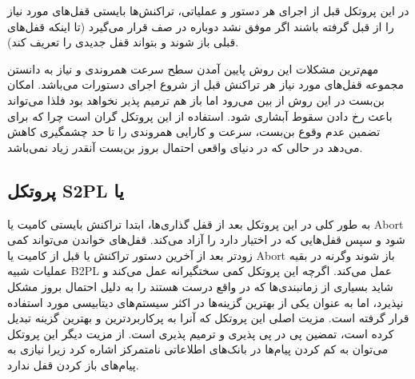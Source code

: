 \documentclass[a4paper]{article}
\begin{document}
در این پروتکل قبل از اجرای هر دستور و عملیاتی، تراکنش‌ها بایستی قفل‌های مورد
نیاز را از قبل گرفته باشند اگر موفق نشد دوباره در صف قرار می‌گیرد (تا اینکه
قفل‌های قبلی باز شوند و بتواند قفل جدیدی را تعریف کند).

\begin{LTR}
    \begin{table}[h]
        \begin{RTL}
            \caption{زمانبندی $S_{7}$}
        \end{RTL}
        \centering
    \end{table}
\end{LTR}

مهم‌ترین مشکلات این روش پایین آمدن سطح سرعت همروندی و نیاز به دانستن مجموعه
قفل‌های مورد نیاز هر تراکنش قبل از شروع اجرای دستورات می‌باشد. امکان بن‌بست در
این روش از بین می‌رود اما باز هم ترمیم پذیر نخواهد بود فلذا می‌تواند باعث رخ
دادن سقوط آبشاری شود. استفاده از این پروتکل گران است چرا که برای تضمین عدم وقوع
بن‌بست، سرعت و کارایی همروندی را تا حد چشمگیری کاهش می‌دهد در حالی که در دنیای
واقعی احتمال بروز بن‌بست آنقدر زیاد نمی‌باشد.

\subsection{پروتکل S2PL یا }

به طور کلی در این پروتکل بعد از قفل گذاری‌ها، ابتدا تراکنش بایستی کامیت یا Abort
شود و سپس قفل‌هایی که در اختیار دارد را آزاد می‌کند. قفل‌های خواندن می‌تواند کمی
زودتر بعد از آخرین دستور تراکنش یا قبل از کامیت یا Abort باز شوند وگرنه در بقیه
عملیات شبیه B2PL عمل می‌کند. اگرچه این پروتکل کمی سختگیرانه عمل می‌کند و شاید
بسیاری از زمانبندی‌ها که در واقع درست هستند را به دلیل احتمال بروز مشکل نپذیرد،
اما به عنوان یکی از بهترین گزینه‌ها در اکثر سیستم‌های دیتابیسی مورد استفاده قرار
گرفته است. مزیت اصلی این پروتکل که آنرا به پرکاربردترین و بهترین گزینه تبدیل
کرده است، تمضین پی در پی پذیری و ترمیم پذیری است. از مزیت دیگر این پروتکل
می‌توان به کم کردن پیام‌ها در بانک‌های اطلاعاتی نامتمرکز اشاره کرد زیرا نیازی به
پیام‌های باز کردن قفل ندارد.
\end{document}

